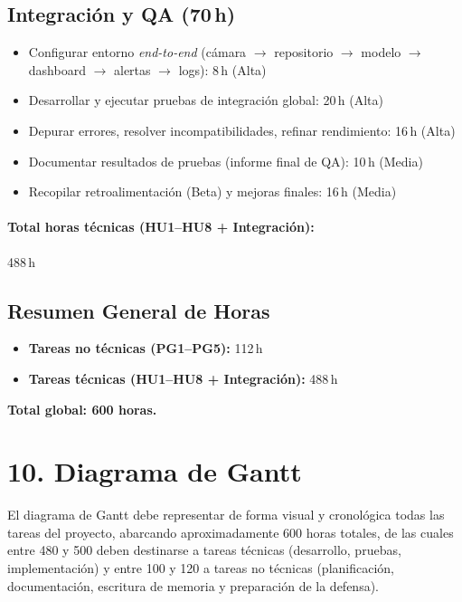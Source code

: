 \documentclass[
11pt, %
]{ProyectoVpC}
\begin{document}
\vspace{1em}
\subsection{Integración y QA (70\,h)}
\begin{itemize}
  \item Configurar entorno \emph{end-to-end} (cámara $\rightarrow$ repositorio $\rightarrow$ modelo $\rightarrow$ dashboard $\rightarrow$ alertas $\rightarrow$ logs): 8\,h (Alta)
  \item Desarrollar y ejecutar pruebas de integración global: 20\,h (Alta)
  \item Depurar errores, resolver incompatibilidades, refinar rendimiento: 16\,h (Alta)
  \item Documentar resultados de pruebas (informe final de QA): 10\,h (Media)
  \item Recopilar retroalimentación (Beta) y mejoras finales: 16\,h (Media)
\end{itemize}

\paragraph{Total horas técnicas (HU1--HU8 + Integración):} 488\,h

\vspace{1em}
\subsection{Resumen General de Horas}
\begin{itemize}
  \item \textbf{Tareas no técnicas (PG1--PG5):} 112\,h
  \item \textbf{Tareas técnicas (HU1--HU8 + Integración):} 488\,h
\end{itemize}

\noindent \textbf{Total global: 600 horas.}


\section{10. Diagrama de Gantt}
\label{sec:gantt}

El diagrama de Gantt debe representar de forma visual y cronológica todas las tareas del proyecto, abarcando aproximadamente 600 horas totales, de las cuales entre 480 y 500 deben destinarse a tareas técnicas (desarrollo, pruebas, implementación) y entre 100 y 120 a tareas no técnicas (planificación, documentación, escritura de memoria y preparación de la defensa).
\end{document}
